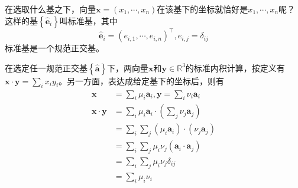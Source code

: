 \documentclass[main.tex]{subfiles}
\begin{document}
\begin{example}
在选取什么基之下，向量$\mathbf{x}=\left(x_1,\cdots,x_n\right)$在该基下的坐标就恰好是$x_1,\cdots,x_n$呢？这样的基$\left\{\mathbf{\hat{e}}_i\right\}$叫标准基，其中
\[\mathbf{\hat{e}}_i=\left(e_{i,1},\cdots,e_{i,n}\right)^\intercal,e_{i,j}=\delta_{ij}\]
标准基是一个规范正交基。

在选定任一规范正交基$\left\{\hat{\mathbf{a}}\right\}$下，两向量$\mathbf{x}$和$\mathbf{y}\in\mathbb{R}^3$的标准内积计算，按定义有$\mathbf{x}\cdot\mathbf{y}=\sum_ix_iy_i$。另一方面，表达成给定基下的坐标后，则有
\begin{align*}
\mathbf{x}&=\sum_i\mu_i\mathbf{a}_i,\mathbf{y}=\sum_i\nu_i\mathbf{a}_i\\
\mathbf{x}\cdot\mathbf{y}&=\sum_i\mu_i\mathbf{a}_i\cdot\left(\sum_j\nu_j\mathbf{a}_j\right)\\
&=\sum_i\sum_j\left(\mu_i\mathbf{a}_i\right)\cdot\left(\nu_j\mathbf{a}_j\right)\\
&=\sum_i\sum_j\mu_i\nu_j\left(\mathbf{a}_i\cdot\mathbf{a}_j\right)\\
&=\sum_i\sum_j\mu_i\nu_j\delta_{ij}\\
&=\sum_i\mu_i\nu_i
\end{align*}
\end{example}
\end{document}
